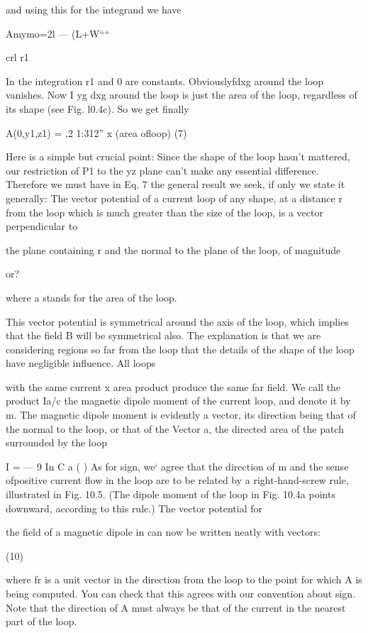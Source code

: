 {{and using this for the integrand we have

Amymo=2l --- (L+W````%

crl r1

In the integration r1 and 0 are constants. Obviouslyfdxg around
the loop vanishes. Now I yg dxg around the loop is just the area
of the loop, regardless of its shape (see Fig. l0.4c). So we get finally

A(0,y1,z1) = ,2 1:312'' x (area ofloop) (7)

Here is a simple but crucial point: Since the shape of the loop
hasn't mattered, our restriction of P1 to the yz plane can't make any
essential difference. Therefore we must have in Eq. 7 the general
result we seek, if only we state it generally: The vector potential of
a current loop of any shape, at a distance r from the loop which is
much greater than the size of the loop, is a vector perpendicular to

the plane containing r and the normal to the plane of the loop, of
magnitude

or?

where a stands for the area of the loop.

This vector potential is symmetrical around the axis of the loop,
which implies that the field B will be symmetrical also. The explanation
is that we are considering regions so far from the loop that the
details of the shape of the loop have negligible influence. All loops

 

with the same current x area product produce the same far field.
We call the product Ia/c the magnetic dipole moment of the current
loop, and denote it by m. The magnetic dipole moment is evidently
a vector, its direction being that of the normal to the loop, or that
of the Vector a, the directed area of the patch surrounded by the loop

I
=  ---  9
In C a ( )
As for sign, we‘ agree that the direction of m and the sense ofpositive
current flow in the loop are to be related by a right-hand-screw rule,
illustrated in Fig. 10.5. (The dipole moment of the loop in Fig. 10.4a
points downward, according to this rule.) The vector potential for

the field of a magnetic dipole in can now be written neatly with
vectors:

(10)

where fr is a unit vector in the direction from the loop to the point for
which A is being computed. You can check that this agrees with
our convention about sign. Note that the direction of A must always
be that of the current in the nearest part of the loop.

}}
